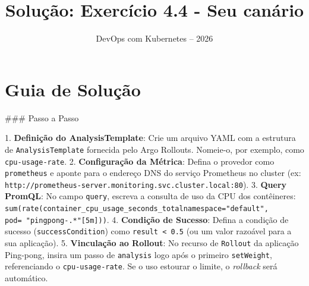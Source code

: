 \documentclass[11pt,a4paper]{article}
\title{\color{secondary}\Huge\textbf{Solução: Exercício 4.4 - Seu canário}}
\author{\color{primary}DevOps com Kubernetes -- 2026}
\date{}
\begin{document}
\maketitle

\section*{\color{primary}Guia de Solução}
\begin{tcolorbox}[colback=green!5!white,colframe=green!60!black,title=Resolução Passo a Passo]
### Passo a Passo

1. \textbf{Definição do AnalysisTemplate}: Crie um arquivo YAML com a estrutura de \texttt{AnalysisTemplate} fornecida pelo Argo Rollouts. Nomeie-o, por exemplo, como \texttt{cpu-usage-rate}.
2. \textbf{Configuração da Métrica}: Defina o provedor como \texttt{prometheus} e aponte para o endereço DNS do serviço Prometheus no cluster (ex: \texttt{http://prometheus-server.monitoring.svc.cluster.local:80}).
3. \textbf{Query PromQL}: No campo \texttt{query}, escreva a consulta de uso da CPU dos contêineres: \texttt{sum(rate(container_cpu_usage_seconds_total{namespace="default", pod=~"pingpong-.*"}[5m]))}.
4. \textbf{Condição de Sucesso}: Defina a condição de sucesso (\texttt{successCondition}) como \texttt{result < 0.5} (ou um valor razoável para a sua aplicação).
5. \textbf{Vinculação ao Rollout}: No recurso de \texttt{Rollout} da aplicação Ping-pong, insira um passo de \texttt{analysis} logo após o primeiro \texttt{setWeight}, referenciando o \texttt{cpu-usage-rate}. Se o uso estourar o limite, o \textit{rollback} será automático.
\end{tcolorbox}
\end{document}

